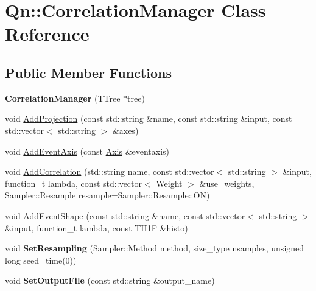 \hypertarget{classQn_1_1CorrelationManager}{}\section{Qn\+:\+:Correlation\+Manager Class Reference}
\label{classQn_1_1CorrelationManager}
\subsection*{Public Member Functions}
\begin{DoxyCompactItemize}
\item 
\mbox{\label{classQn_1_1CorrelationManager_a215b0d59ff6acc275457cf176719b148}} 
{\bfseries Correlation\+Manager} (T\+Tree $\ast$tree)
\item 
void \mbox{\hyperlink{classQn_1_1CorrelationManager_a5f7b47021c3ce6ec3a387937a06b4e95}{Add\+Projection}} (const std\+::string \&name, const std\+::string \&input, const std\+::vector$<$ std\+::string $>$ \&axes)
\item 
void \mbox{\hyperlink{classQn_1_1CorrelationManager_a43107c340479dc6449d753c1b7a2f5b8}{Add\+Event\+Axis}} (const \mbox{\hyperlink{classQn_1_1Axis}{Axis}} \&eventaxis)
\item 
void \mbox{\hyperlink{classQn_1_1CorrelationManager_a233ce1f4adccfc3b8caff8c1f062ad7b}{Add\+Correlation}} (std\+::string name, const std\+::vector$<$ std\+::string $>$ \&input, function\+\_\+t lambda, const std\+::vector$<$ \mbox{\hyperlink{classWeight}{Weight}} $>$ \&use\+\_\+weights, Sampler\+::\+Resample resample=Sampler\+::\+Resample\+::\+ON)
\item 
void \mbox{\hyperlink{classQn_1_1CorrelationManager_a4f10c2abbb818935b6283ea216dc6501}{Add\+Event\+Shape}} (const std\+::string \&name, const std\+::vector$<$ std\+::string $>$ \&input, function\+\_\+t lambda, const T\+H1F \&histo)
\item 
\mbox{\label{classQn_1_1CorrelationManager_a1a5814af2135c433bf474b4cf796ca4d}} 
void {\bfseries Set\+Resampling} (Sampler\+::\+Method method, size\+\_\+type nsamples, unsigned long seed=time(0))
\item 
\mbox{\label{classQn_1_1CorrelationManager_a8010ce518eb9ae5d837640a5b96bb43f}} 
void {\bfseries Set\+Output\+File} (const std\+::string \&output\+\_\+name)

\end{DoxyCompactItemize}

